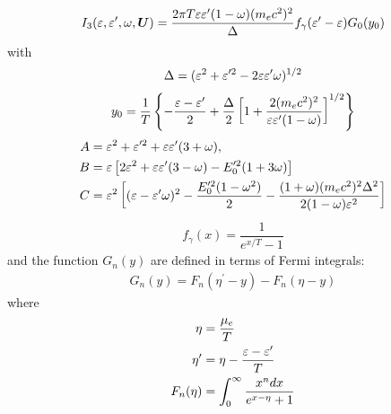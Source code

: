 \documentclass[10pt,preprint]{aastex}
\begin{document}
\begin{align}
I_3(\varepsilon, \varepsilon^\prime, \omega, \boldsymbol{U})  = \dfrac{2\pi T \varepsilon \varepsilon^{\prime}(1-\omega)(m_ec^2)^2}{\Delta} f_\gamma(\varepsilon^\prime - \varepsilon) G_0(y_0)
\end{align}
with
\begin{align}
\Delta = (\varepsilon^2 + \varepsilon^{\prime 2} - 2\varepsilon \varepsilon^\prime
\omega)^{1/2}
\end{align}
\begin{align}
y_0 = \dfrac{1}{T}\left\lbrace - \dfrac{\varepsilon -\varepsilon^\prime}{2} + \dfrac{\Delta}{2} \left[1+\dfrac{2(m_e c^2)^2}{\varepsilon \varepsilon^\prime (1-\omega)}\right]^{1/2} \right\rbrace 
\end{align}
\begin{align}
A &= \varepsilon^2 + \varepsilon^{\prime 2} + \varepsilon \varepsilon^\prime(3+\omega),\\
B &= \varepsilon \left[ 2\varepsilon^2 + \varepsilon \varepsilon^\prime(3-\omega) - E^{\prime 2}_0(1+3\omega) \right] \\
C &= \varepsilon^2\left[ (\varepsilon -\varepsilon^\prime \omega)^2 - \dfrac{E^{\prime 2}_0 (1-\omega^2)}{2} - \dfrac{(1+\omega)(m_e c^2)^2 \Delta^2}{2(1-\omega)\varepsilon^2} \right] 
\end{align}
\begin{align}
f_{\gamma}(x) = \dfrac{1}{e^{x/T} - 1}
\end{align}
and the function $G_n(y)$ are defined in terms of Fermi integrals:
\begin{align}
G_n(y) = F_n(\eta^\prime - y) - F_n(\eta - y)
\end{align}
where
\begin{align}
\eta &= \dfrac{\mu_e}{T} \\
\eta^\prime &= \eta - \dfrac{\varepsilon - \varepsilon^\prime}{T} \\
F_n(\eta) &= \int_{0}^{\infty} \dfrac{x^n dx}{e^{x-\eta}+1}
\end{align}
\end{document}
